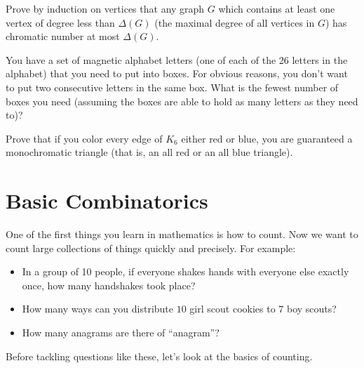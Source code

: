 \documentclass[10pt,]{book}
\theoremstyle{plain}
\theoremstyle{definition}
\theoremstyle{definition}
\theoremstyle{definition}
\theoremstyle{definition}
\numberwithin{equation}{chapter}
\begin{document}
\begin{divisionexercise}{9}\hypertarget{exercise-48}{}
\hypertarget{p-369}{}%
Prove by induction on vertices that any graph \(G\) which contains at least one vertex of degree less than \(\Delta(G)\) (the maximal degree of all vertices in \(G\)) has chromatic number at most \(\Delta(G)\).%
\end{divisionexercise}%
\begin{divisionexercise}{10}\hypertarget{exercise-49}{}
\hypertarget{p-370}{}%
You have a set of magnetic alphabet letters (one of each of the 26 letters in the alphabet) that you need to put into boxes. For obvious reasons, you don't want to put two consecutive letters in the same box. What is the fewest number of boxes you need (assuming the boxes are able to hold as many letters as they need to)?%
\end{divisionexercise}%
\begin{divisionexercise}{11}\hypertarget{exercise-50}{}
\hypertarget{p-372}{}%
Prove that if you color every edge of \(K_6\) either red or blue, you are guaranteed a monochromatic triangle (that is, an all red or an all blue triangle).%
\end{divisionexercise}%
\typeout{************************************************}
\typeout{************************************************}
\chapter[{Basic Combinatorics}]{Basic Combinatorics}\label{ch_basic-combinatorics}
\hypertarget{p-373}{}%
One of the first things you learn in mathematics is how to count. Now we want to count large collections of things quickly and precisely. For example: \leavevmode%
\begin{itemize}[label=\textbullet]
\item{}\hypertarget{p-374}{}%
In a group of 10 people, if everyone shakes hands with everyone else exactly once, how many handshakes took place?%
\item{}\hypertarget{p-375}{}%
How many ways can you distribute \(10\) girl scout cookies to \(7\) boy scouts?%
\item{}\hypertarget{p-376}{}%
How many anagrams are there of ``anagram''?%
\end{itemize}
%
\par
\hypertarget{p-377}{}%
Before tackling questions like these, let's look at the basics of counting.%
\typeout{************************************************}
\typeout{************************************************}
\end{document}
